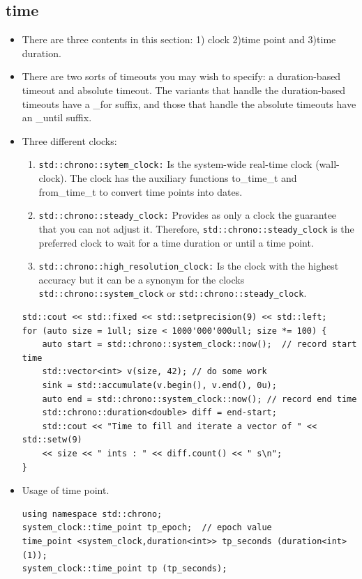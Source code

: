 \documentclass[a4paper,11pt,twoside]{book}
\begin{document}
\subsection{time}
\begin{itemize}
	\item There are three contents in this section: 1) clock 2)time point and 3)time duration.
	
	\item There are two sorts of timeouts you may wish to specify: a duration-based timeout and absolute timeout. The variants that handle the duration-based timeouts have a \_for suffix, and those that handle the absolute timeouts have an \_until suffix.

	\item Three different clocks:
	\begin{enumerate}
		\item \texttt{std::chrono::sytem\_clock:} Is the system-wide real-time clock (wall-clock). The clock has the auxiliary functions to\_time\_t and from\_time\_t to convert time points into dates.
		
		\item \texttt{std::chrono::steady\_clock:}  Provides as only a clock the guarantee that you can not adjust it. Therefore, \texttt{std::chrono::steady\_clock} is the preferred clock to wait for a time duration or until a time point.
		
		\item \texttt{std::chrono::high\_resolution\_clock:} Is the clock with the highest accuracy but it can be a synonym for the clocks \texttt{std::chrono::system\_clock} or \texttt{std::chrono::steady\_clock}.
	\end{enumerate}

\begin{lstlisting}[numbers=none]
std::cout << std::fixed << std::setprecision(9) << std::left;
for (auto size = 1ull; size < 1000'000'000ull; size *= 100) {
	auto start = std::chrono::system_clock::now(); 	// record start time
	std::vector<int> v(size, 42); // do some work
	sink = std::accumulate(v.begin(), v.end(), 0u); 
	auto end = std::chrono::system_clock::now(); // record end time
	std::chrono::duration<double> diff = end-start;
	std::cout << "Time to fill and iterate a vector of " << std::setw(9)
	<< size << " ints : " << diff.count() << " s\n";
}
\end{lstlisting}

	\item Usage of time point.
\begin{lstlisting}[numbers=none]
using namespace std::chrono;
system_clock::time_point tp_epoch;	// epoch value
time_point <system_clock,duration<int>> tp_seconds (duration<int>(1));
system_clock::time_point tp (tp_seconds);


\end{lstlisting}
\end{itemize}
\end{document}
